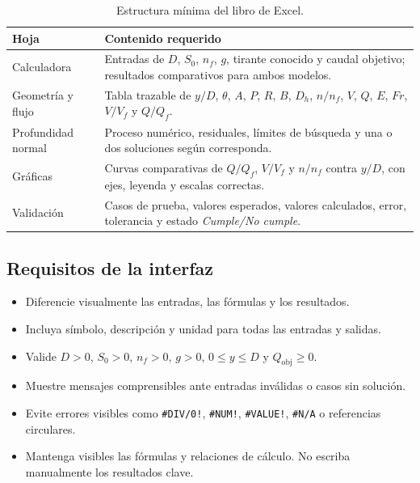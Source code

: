 \documentclass[12pt]{article}
\begin{document}
\begin{table}[H]
\centering
\caption{Estructura mínima del libro de Excel.}
\label{tab:hojas}
\begin{tabularx}{\textwidth}{>{\raggedright\arraybackslash}p{} >{\raggedright\arraybackslash}X}
\toprule
\textbf{Hoja} & \textbf{Contenido requerido} \\
\midrule
Calculadora & Entradas de $D$, $S_0$, $n_f$, $g$, tirante conocido y caudal objetivo; resultados comparativos para ambos modelos. \\
Geometría y flujo & Tabla trazable de $y/D$, $\theta$, $A$, $P$, $R$, $B$, $D_h$, $n/n_f$, $V$, $Q$, $E$, $Fr$, $V/V_f$ y $Q/Q_f$. \\
Profundidad normal & Proceso numérico, residuales, límites de búsqueda y una o dos soluciones según corresponda. \\
Gráficas & Curvas comparativas de $Q/Q_f$, $V/V_f$ y $n/n_f$ contra $y/D$, con ejes, leyenda y escalas correctas. \\
Validación & Casos de prueba, valores esperados, valores calculados, error, tolerancia y estado \emph{Cumple/No cumple}. \\
\bottomrule
\end{tabularx}
\end{table}

\subsection{Requisitos de la interfaz}
\begin{itemize}
\item Diferencie visualmente las entradas, las fórmulas y los resultados.
\item Incluya símbolo, descripción y unidad para todas las entradas y salidas.
\item Valide $D>0$, $S_0>0$, $n_f>0$, $g>0$, $0\leq y\leq D$ y $Q_{\mathrm{obj}}\geq0$.
\item Muestre mensajes comprensibles ante entradas inválidas o casos sin solución.
\item Evite errores visibles como \texttt{\#DIV/0!}, \texttt{\#NUM!}, \texttt{\#VALUE!}, \texttt{\#N/A} o referencias circulares.
\item Mantenga visibles las fórmulas y relaciones de cálculo. No escriba manualmente los resultados clave.
\end{itemize}
\end{document}
